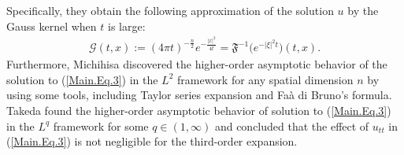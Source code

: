 \documentclass[11pt,reqno]{amsart}
\newcommand{\ity}{\infty}
\begin{document}
Specifically, they obtain the following  approximation of the solution $u$ by the Gauss kernel when $t$ is large:
\begin{align*}
    \mathcal{G}(t,x) := (4\pi t)^{-\frac{n}{2}} e^{-\frac{|x|^2}{4t}} = \mathfrak{F}^{-1}\big(e^{-|\xi|^2t}\big)(t,x).
\end{align*}
Furthermore, Michihisa \cite{Michihisa2021} discovered the higher-order asymptotic behavior of the solution to  (\ref{Main.Eq.3}) in the $L^2$ framework for any spatial dimension $n$ by using some tools, including Taylor series expansion and Faà di Bruno’s formula. Takeda \cite{Takeda2015} found the higher-order asymptotic behavior of solution to (\ref{Main.Eq.3})  in the $L^q$ framework for some $q\in (1,\ity)$ and concluded that  the effect of $u_{tt}$ in (\ref{Main.Eq.3}) is not
negligible for the third-order expansion. 
\end{document}
